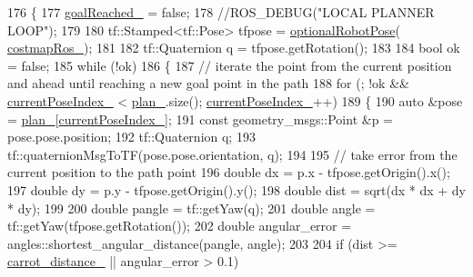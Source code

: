 \begin{DoxyCode}
176 \{
177     \hyperlink{classmove__base__z__client_1_1forward__local__planner_1_1ForwardLocalPlanner_a2c86f8381cc3b8677f95f32ae6939023}{goalReached\_} = \textcolor{keyword}{false};
178     \textcolor{comment}{//ROS\_DEBUG("LOCAL PLANNER LOOP");}
179 
180     tf::Stamped<tf::Pose> tfpose = \hyperlink{namespacemove__base__z__client_1_1forward__local__planner_a683a39a154ed5aa179fdb1afb7bfe2e4}{optionalRobotPose}(
      \hyperlink{classmove__base__z__client_1_1forward__local__planner_1_1ForwardLocalPlanner_a00139db9509e49ff456276a86785d234}{costmapRos\_});
181 
182     tf::Quaternion q = tfpose.getRotation();
183 
184     \textcolor{keywordtype}{bool} ok = \textcolor{keyword}{false};
185     \textcolor{keywordflow}{while} (!ok)
186     \{
187         \textcolor{comment}{// iterate the point from the current position and ahead until reaching a new goal point in the
       path}
188         \textcolor{keywordflow}{for} (; !ok && \hyperlink{classmove__base__z__client_1_1forward__local__planner_1_1ForwardLocalPlanner_a7033550f29cdac00cc997a3ce352dfd1}{currentPoseIndex\_} < \hyperlink{classmove__base__z__client_1_1forward__local__planner_1_1ForwardLocalPlanner_a1c6191c999481e31fabd41f7a04041fe}{plan\_}.size(); 
      \hyperlink{classmove__base__z__client_1_1forward__local__planner_1_1ForwardLocalPlanner_a7033550f29cdac00cc997a3ce352dfd1}{currentPoseIndex\_}++)
189         \{
190             \textcolor{keyword}{auto} &pose = \hyperlink{classmove__base__z__client_1_1forward__local__planner_1_1ForwardLocalPlanner_a1c6191c999481e31fabd41f7a04041fe}{plan\_}[\hyperlink{classmove__base__z__client_1_1forward__local__planner_1_1ForwardLocalPlanner_a7033550f29cdac00cc997a3ce352dfd1}{currentPoseIndex\_}];
191             \textcolor{keyword}{const} geometry\_msgs::Point &p = pose.pose.position;
192             tf::Quaternion q;
193             tf::quaternionMsgToTF(pose.pose.orientation, q);
194 
195             \textcolor{comment}{// take error from the current position to the path point}
196             \textcolor{keywordtype}{double} dx = p.x - tfpose.getOrigin().x();
197             \textcolor{keywordtype}{double} dy = p.y - tfpose.getOrigin().y();
198             \textcolor{keywordtype}{double} dist = sqrt(dx * dx + dy * dy);
199 
200             \textcolor{keywordtype}{double} pangle = tf::getYaw(q);
201             \textcolor{keywordtype}{double} angle = tf::getYaw(tfpose.getRotation());
202             \textcolor{keywordtype}{double} angular\_error = angles::shortest\_angular\_distance(pangle, angle);
203 
204             \textcolor{keywordflow}{if} (dist >= \hyperlink{classmove__base__z__client_1_1forward__local__planner_1_1ForwardLocalPlanner_a11c96a46695fedcc1508944b85079cb5}{carrot\_distance\_} || angular\_error > 0.1)

\end{DoxyCode}
